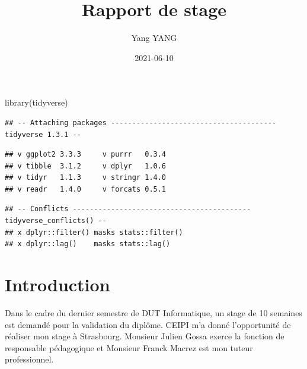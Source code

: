 \documentclass[
  oneside]{book}
\title{Rapport de stage}
\author{Yang YANG}
\date{2021-06-10}
\newenvironment{Shaded}{\begin{snugshade}}{\end{snugshade}}
\newcommand{\AttributeTok}[1]{\textcolor[rgb]{0.77,0.63,0.00}{#1}}
\newcommand{\ConstantTok}[1]{\textcolor[rgb]{0.00,0.00,0.00}{#1}}
\newcommand{\FunctionTok}[1]{\textcolor[rgb]{0.00,0.00,0.00}{#1}}
\newcommand{\NormalTok}[1]{#1}
\newcommand{\SpecialCharTok}[1]{\textcolor[rgb]{0.00,0.00,0.00}{#1}}
\begin{document}
\maketitle

{
\setcounter{tocdepth}{1}
\tableofcontents
}
\begin{Shaded}
\begin{Highlighting}[]
\FunctionTok{library}\NormalTok{(tidyverse)}
\end{Highlighting}
\end{Shaded}

\begin{verbatim}
## -- Attaching packages --------------------------------------- tidyverse 1.3.1 --
\end{verbatim}

\begin{verbatim}
## v ggplot2 3.3.3     v purrr   0.3.4
## v tibble  3.1.2     v dplyr   1.0.6
## v tidyr   1.1.3     v stringr 1.4.0
## v readr   1.4.0     v forcats 0.5.1
\end{verbatim}

\begin{verbatim}
## -- Conflicts ------------------------------------------ tidyverse_conflicts() --
## x dplyr::filter() masks stats::filter()
## x dplyr::lag()    masks stats::lag()
\end{verbatim}

\begin{Shaded}
\end{Shaded}

\hypertarget{introduction}{%
\chapter{Introduction}\label{introduction}}

Dans le cadre du dernier semestre de DUT Informatique, un stage de 10 semaines est demandé pour la validation du diplôme. CEIPI m'a donné l'opportunité de réaliser mon stage à Strasbourg. Monsieur Julien Gossa exerce la fonction de responsable pédagogique et Monsieur Franck Macrez est mon tuteur professionnel.
\end{document}
